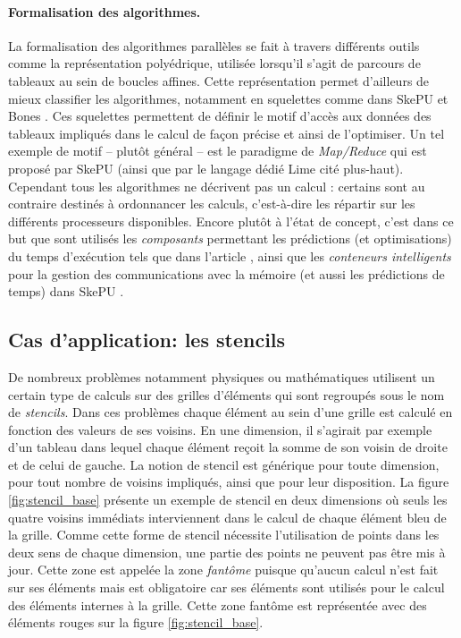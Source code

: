 \paragraph{Formalisation des algorithmes.}
La formalisation des algorithmes parallèles se fait à travers différents outils comme la représentation polyédrique, utilisée lorsqu'il s'agit de parcours de tableaux au sein de boucles affines. Cette représentation permet d'ailleurs de mieux classifier les algorithmes, notamment en squelettes comme dans \textsf{SkePU} et \textsf{Bones} \cite{Art4,Art3,Art9}. Ces squelettes permettent de définir le motif d'accès aux données des tableaux impliqués dans le calcul de façon précise et ainsi de l'optimiser. Un tel exemple de motif -- plutôt général -- est le paradigme de \emph{Map/Reduce} qui est proposé par \textsf{SkePU} (ainsi que par le langage dédié \textsf{Lime} cité plus-haut). Cependant tous les algorithmes ne décrivent pas un calcul : certains sont au contraire destinés à ordonnancer les calculs, c'est-à-dire les répartir sur les différents processeurs disponibles. Encore plutôt à l'état de concept, c'est dans ce but que sont utilisés les \emph{composants} permettant les prédictions (et optimisations) du temps d'exécution tels que dans l'article \cite{Art7}, ainsi que les \emph{conteneurs intelligents} pour la gestion des communications avec la mémoire (et aussi les prédictions de temps) dans \textsf{SkePU} \cite[p.~78]{Ths1}.

\subsection{Cas d'application: les stencils}
\label{sec:stencil_base}

De nombreux problèmes notamment physiques ou mathématiques utilisent un certain type de calculs sur des grilles d'éléments qui sont regroupés sous le nom de \emph{stencils}. Dans ces problèmes chaque élément au sein d'une grille est calculé en fonction des valeurs de ses voisins. En une dimension, il s'agirait par exemple d'un tableau dans lequel chaque élément reçoit la somme de son voisin de droite et de celui de gauche. La notion de stencil est générique pour toute dimension, pour tout nombre de voisins impliqués, ainsi que pour leur disposition. La figure \ref{fig:stencil_base} présente un exemple de stencil en deux dimensions où seuls les quatre voisins immédiats interviennent dans le calcul de chaque élément bleu de la grille. Comme cette forme de stencil nécessite l'utilisation de points dans les deux sens de chaque dimension, une partie des points ne peuvent pas être mis à jour. Cette zone est appelée la zone \emph{fantôme} puisque qu'aucun calcul n'est fait sur ses éléments mais est obligatoire car ses éléments sont utilisés pour le calcul des éléments internes à la grille. Cette zone fantôme est représentée avec des éléments rouges sur la figure \ref{fig:stencil_base}.

